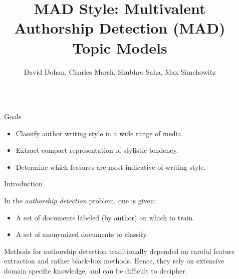 \documentclass[final]{beamer}
\title{MAD Style: Multivalent Authorship Detection (MAD) Topic Models} %
\author{David Dohan, Charles Marsh, Shubhro Saha, Max Simchowitz} %
\institute{Princeton University, Department of Computer Science} %
\newlength{\sepwid}
\newlength{\onecolwid}
\begin{document}

\setlength{\belowcaptionskip}{2ex} %
\setlength\belowdisplayshortskip{2ex} %

\begin{frame}[t]  %

\begin{columns}[t] %

\begin{column}{\sepwid}\end{column} %

\begin{column}{\onecolwid} %


\begin{alertblock}{Goals}
\begin{itemize}
\item Classify author writing style in a wide range of media.
\item Extract compact representation of stylistic tendency.
\item Determine which features are most indicative of writing style.
\end{itemize}
\end{alertblock}


\begin{block}{Introduction}

In the \textit{authorship detection} problem, one is given:
\begin{itemize}
\item A set of documents labeled (by author) on which to train.
\item A set of anonymized documents to classify.
\end{itemize} Methods for authorship detection traditionally depended on careful feature extraction and rather black-box methods. Hence, they rely on extensive domain specific knowledge, and can be difficult to decipher.


\end{block}
\end{column}
\end{columns}
\end{frame}
\end{document}
